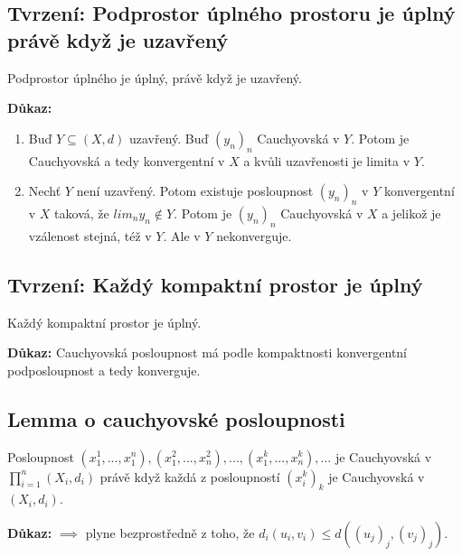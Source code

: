 \documentclass[10pt]{article}
\begin{document}
\subsection{Tvrzení: Podprostor úplného prostoru je úplný právě když je uzavřený}
\hspace{1.2mm}
\noindent
Podprostor úplného je úplný, právě když je uzavřený.

\vspace{5mm}
\noindent
\textbf{Důkaz:} 
\begin{enumerate}
    \item Buď $Y \subseteq (X,d)$ uzavřený. Buď $(y_n)_n$ Cauchyovská v $Y$. Potom je Cauchyovská 
    a tedy konvergentní v $X$ a kvůli uzavřenosti je limita v $Y$.
    \item Nechť $Y$ není uzavřený. Potom existuje posloupnost $(y_n)_n$ v $Y$ konvergentní v $X$ taková, že $lim_n y_n \notin Y$.
    Potom je $(y_n)_n$ Cauchyovská v $X$ a jelikož je vzálenost stejná, též v $Y$. Ale v $Y$ nekonverguje.
\end{enumerate}

\subsection{Tvrzení: Každý kompaktní prostor je úplný}
\hspace{1.2mm}
\noindent
Každý kompaktní prostor je úplný.

\vspace{5mm}
\noindent
\textbf{Důkaz:} Cauchyovská posloupnost má podle kompaktnosti konvergentní podposloupnost a tedy konverguje.

\subsection{Lemma o cauchyovské posloupnosti}
\hspace{1.2mm}
\noindent
Posloupnost $(x_{1}^{1}, ... , x_{1}^{n}), (x_{1}^{2},...,x_{n}^{2}), ...,(x_{1}^{k},...,x_{n}^{k}),...$
je Cauchyovská v $\prod_{i=1}^{n}(X_i, d_i)$ právě když každá z posloupností $(x_{i}^{k})_k$ je
Cauchyovská v $(X_i, d_i)$.

\vspace{5mm}
\noindent
\textbf{Důkaz:} $\implies$ plyne bezprostředně z toho, že $d_i(u_i,v_i) \leq d((u_j)_j,(v_j)_j).$
\end{document}
